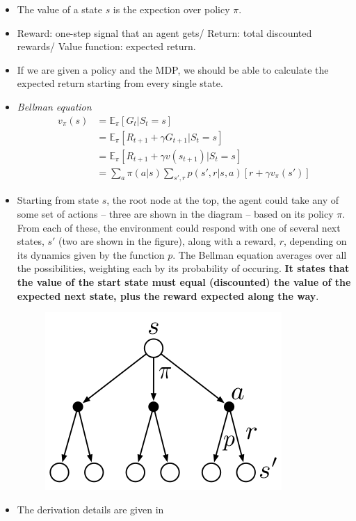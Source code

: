 \begin{itemize}
	\item The value of a state $s$ is the expection over policy $\pi$.
	\item Reward: one-step signal that an agent gets/ Return: total discounted rewards/ Value function: expected return. 
	\item If we are given a policy and the MDP, we should be able to calculate the expected return starting from every single state. 
\end{itemize}

\begin{itemize}
	\item \textit{Bellman equation}
\begin{align*}
	v_\pi(s) &= \mathbb{E}_\pi[G_t|S_t=s]\\
	& = \mathbb{E}_\pi[R_{t+1} + \gamma G_{t+1}|S_t=s]\\
	& = \mathbb{E}_\pi[R_{t+1} + \gamma v(s_{t+1})|S_t=s]\\
	& = \sum_{a}\pi(a|s)\sum_{s',r}p(s',r|s,a)[r + \gamma v_\pi(s')]
\end{align*}
\item Starting from state $s$, the root node at the top, the agent could take any of some set of actions -- three are shown in the diagram -- based on its policy $\pi$. From each of these, the environment could respond with one of several next states, $s'$ (two are shown in the figure), along with a reward, $r$, depending on its dynamics given by the function $p$. The Bellman equation averages over all the possibilities, weighting each by its probability of occuring. \textbf{It states that the value of the start state must equal (discounted) the value of the expected next state, plus the reward expected along the way}. 
	\begin{figure}[h]
		\centering
		\includegraphics[scale=0.3]{./images/backup_vpi.png}
	\end{figure}
\item The derivation details are given in 
\end{itemize}

